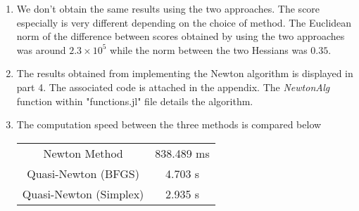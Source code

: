 \documentclass[landscape]{article} %
\theoremstyle{definition}
\begin{document}
\begin{enumerate}

	\item We don't obtain the same results using the two approaches. The score especially is very different depending on the choice of method. The Euclidean norm of the difference between scores obtained by using the two approaches was around $ 2.3 \times 10^5 $ while the norm between the two Hessians was $ 0.35 $.
	
	
	\item The results obtained from implementing the Newton algorithm is displayed in part 4. The associated code is attached in the appendix. The \textit{NewtonAlg} function within  "functions.jl" file details the algorithm.
	
	
	\item  The computation speed between the three methods is compared below
	\begin{table}[H]
		\centering
		\begin{tabular}{c c }
			\hline
			Newton Method & 838.489 ms\\
			Quasi-Newton (BFGS) & 4.703 s\\
			Quasi-Newton (Simplex) & 2.935 s\\\hline
		\end{tabular}
	\end{table}
	

\end{enumerate}
\end{document}
